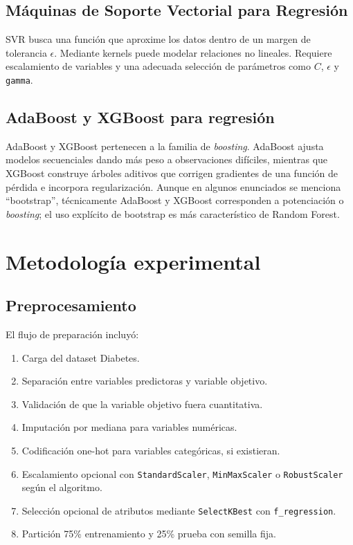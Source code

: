 \documentclass[12pt,letterpaper]{article}
\begin{document}
\subsection{Máquinas de Soporte Vectorial para Regresión}
SVR busca una función que aproxime los datos dentro de un margen de tolerancia $\epsilon$. Mediante kernels puede modelar relaciones no lineales. Requiere escalamiento de variables y una adecuada selección de parámetros como $C$, $\epsilon$ y \texttt{gamma}.

\subsection{AdaBoost y XGBoost para regresión}
AdaBoost y XGBoost pertenecen a la familia de \textit{boosting}. AdaBoost ajusta modelos secuenciales dando más peso a observaciones difíciles, mientras que XGBoost construye árboles aditivos que corrigen gradientes de una función de pérdida e incorpora regularización. Aunque en algunos enunciados se menciona ``bootstrap'', técnicamente AdaBoost y XGBoost corresponden a potenciación o \textit{boosting}; el uso explícito de bootstrap es más característico de Random Forest.

\section{Metodología experimental}

\subsection{Preprocesamiento}
El flujo de preparación incluyó:
\begin{enumerate}
    \item Carga del dataset Diabetes.
    \item Separación entre variables predictoras y variable objetivo.
    \item Validación de que la variable objetivo fuera cuantitativa.
    \item Imputación por mediana para variables numéricas.
    \item Codificación one-hot para variables categóricas, si existieran.
    \item Escalamiento opcional con \texttt{StandardScaler}, \texttt{MinMaxScaler} o \texttt{RobustScaler} según el algoritmo.
    \item Selección opcional de atributos mediante \texttt{SelectKBest} con \texttt{f\_regression}.
    \item Partición 75\% entrenamiento y 25\% prueba con semilla fija.
\end{enumerate}
\end{document}
